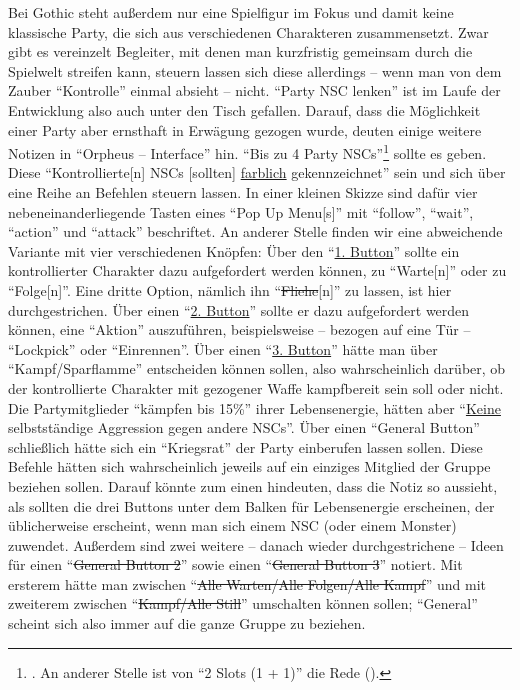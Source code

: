 \documentclass[a5paper,pagesize]{scrbook}
\begin{document}
Bei Gothic steht außerdem nur eine Spielfigur im Fokus und damit keine klassische Party, die sich aus verschiedenen Charakteren zusammensetzt.
Zwar gibt es vereinzelt Begleiter, mit denen man kurzfristig gemeinsam durch die Spielwelt streifen kann, steuern lassen sich diese allerdings -- wenn man von dem Zauber \enquote{Kontrolle} einmal absieht -- nicht. %
\enquote{Party NSC lenken} ist im Laufe der Entwicklung also auch unter den Tisch gefallen.
Darauf, dass die Möglichkeit einer Party aber ernsthaft in Erwägung gezogen wurde, deuten einige weitere Notizen in \enquote{Orpheus -- Interface} hin.
\enquote{Bis zu 4 Party NSCs}\footnote{\autocite[S.~5]{orpheus_interface}. An anderer Stelle ist von \enquote{2 Slots (1 + 1)} die Rede (\autocite[S.~7]{orpheus_b_scribbles}).} sollte es geben.
Diese \enquote{Kontrollierte[n] NSCs [sollten] \uline{farblich} gekennzeichnet}\autocite[S.~5]{orpheus_interface} sein und sich über eine Reihe an Befehlen steuern lassen.
In einer kleinen Skizze sind dafür vier nebeneinanderliegende Tasten eines \enquote{Pop Up Menu[s]} mit \enquote{follow}, \enquote{wait}, \enquote{action} und \enquote{attack} beschriftet.\autocite[S.~3]{orpheus_interface}
An anderer Stelle finden wir eine abweichende Variante mit vier verschiedenen Knöpfen:
Über den \enquote{\uline{1. Button}} sollte ein kontrollierter Charakter dazu aufgefordert werden können, zu \enquote{Warte[n]} oder zu \enquote{Folge[n]}.
Eine dritte Option, nämlich ihn \enquote{\sout{Fliehe}[n]} zu lassen, ist hier durchgestrichen.
Über einen \enquote{\uline{2. Button}} sollte er dazu aufgefordert werden können, eine \enquote{Aktion} auszuführen, beispielsweise -- bezogen auf eine Tür -- \enquote{Lockpick} oder \enquote{Einrennen}.
Über einen \enquote{\uline{3. Button}} hätte man über \enquote{Kampf/Sparflamme} entscheiden können sollen, also wahrscheinlich darüber, ob der kontrollierte Charakter mit gezogener Waffe kampfbereit sein soll oder nicht.
Die Partymitglieder \enquote{kämpfen bis 15\%} ihrer Lebensenergie, hätten aber \enquote{\uline{Keine} selbstständige Aggression gegen andere NSCs}.
Über einen \enquote{General Button} schließlich hätte sich ein \enquote{Kriegsrat} der Party einberufen lassen sollen.
Diese Befehle hätten sich wahrscheinlich jeweils auf ein einziges Mitglied der Gruppe beziehen sollen.
Darauf könnte zum einen hindeuten, dass die Notiz so aussieht, als sollten die drei Buttons unter dem Balken für Lebensenergie erscheinen, der üblicherweise erscheint, wenn man sich einem NSC (oder einem Monster) zuwendet.
Außerdem sind zwei weitere -- danach wieder durchgestrichene -- Ideen für einen \enquote{\sout{General Button 2}} sowie einen \enquote{\sout{General Button 3}} notiert.
Mit ersterem hätte man zwischen \enquote{\sout{Alle Warten/Alle Folgen/Alle Kampf}} und mit zweiterem zwischen \enquote{\sout{Kampf/Alle Still}} umschalten können sollen;\autocite[S.~5]{orpheus_interface} \enquote{General} scheint sich also immer auf die ganze Gruppe zu beziehen.
\end{document}
